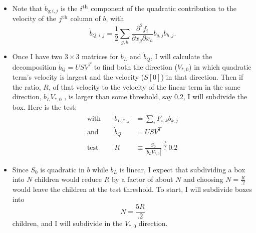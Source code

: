 \documentclass[12pt]{article}
\begin{document}
\begin{itemize}
\item Note that $\dot b_{q;i,j}$ is the $i^{\rm{th}}$ component of the
  quadratic contribution to the velocity of the $j^{\rm{th}}$ column
  of $b$, with
  \begin{equation}
    \label{eq:bdot_ij}
    \dot b_{Q;i,j} = \frac{1}{2} \sum_{g,h} \frac{\partial^2 f_i}{\partial x_g
      \partial x_h} b_{g,j} b_{h,j}.
  \end{equation}
\item Once I have two $3\times 3$ matrices for $\dot b_L$ and
  $\dot b_Q$, I will calculate the decomposition $\dot b_Q = USV^T$ to
  find both the direction ($V_{*,0}$) in which quadratic term's
  velocity is largest and the velocity ($S[0]$) in that direction.
  Then if the ratio, $R$, of that velocity to the velocity of the
  linear term in the same direction, $\dot b_L V_{*,0}$ , is larger
  than some threshold, say 0.2, I will subdivide the box.  Here is the
  test:
  \begin{align}
    \nonumber
    \text{with } && \dot b_{L;*,j} &= \sum_i F_{i,k} b_{k,j} \\
    \nonumber
    \text{and } && \dot b_Q &= USV^T \\
    \label{eq:LQ_ratio}
    \text{test } && R &\equiv \frac{S_0}{\left| \dot b_L V_{*,0}\right|}
                     ~\overset{\geq}{?}~ 0.2
  \end{align}
\item Since $S_0$ is quadratic in $b$ while $b_L$ is linear, I expect
  that subdividing a box into $N$ children would reduce $R$ by a
  factor of about $N$ and choosing $N = \frac{R}{.2}$ would leave the
  children at the test threshold. To start, I will subdivide boxes
  into
  \begin{equation*}
    N = \frac{5R}{.2}
  \end{equation*}
  children, and I will subdivide in the $V_{*,0}$ direction.
\end{itemize}
\end{document}
